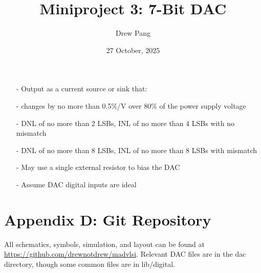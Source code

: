 \documentclass[11pt]{article}
\title{Miniproject 3: 7-Bit DAC}
\author{Drew Pang}
\date{27 October, 2025}
\begin{document}
\maketitle

\begin{itemize}
  \item[-] Output as a current source or sink that:
  \item[-] changes by no more than 0.5\%/V over 80\% of the power supply voltage
  \item[-] DNL of no more than 2 LSBs, INL of no more than 4 LSBs with no mismatch
  \item[-] DNL of no more than 8 LSBs, INL of no more than 8 LSBs with mismatch
  \item[-] May use a single external resistor to bias the DAC
  \item[-] Assume DAC digital inputs are ideal
\end{itemize}



%   
%   

\newpage

\section*{Appendix D: Git Repository}

All schematics, symbols, simulation, and layout can be found at \href{https://github.com/drewnotdrew/madvlsi}{https://github.com/drewnotdrew/madvlsi}. Relevant DAC files are in the dac directory, though some common files are in lib/digital.
\end{document}

